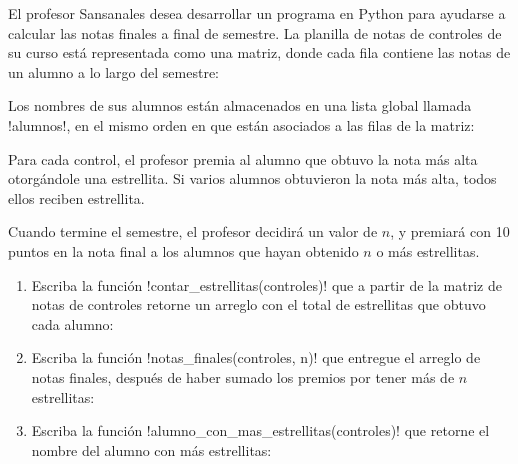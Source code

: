El profesor Sansanales desea desarrollar un programa en Python
para ayudarse a calcular las notas finales a final de semestre.
La planilla de notas de controles de su curso
está representada como una matriz,
donde cada fila contiene las notas de un alumno
a lo largo del semestre:


Los nombres de sus alumnos están almacenados
en una lista global llamada \li!alumnos!,
en el mismo orden en que están asociados a las filas de la matriz:


Para cada control,
el profesor premia al alumno que obtuvo la nota más alta
otorgándole una estrellita.
Si varios alumnos obtuvieron la nota más alta,
todos ellos reciben estrellita.

Cuando termine el semestre,
el profesor decidirá un valor de \(n\),
y premiará con 10 puntos en la nota final
a los alumnos que hayan obtenido \(n\) o más estrellitas.

\begin{enumerate}[leftmargin=0pt,label=\emph{\alph*})]

  \item
    Escriba la función \li!contar_estrellitas(controles)!
    que a partir de la matriz de notas de controles
    retorne un arreglo con el total de estrellitas que obtuvo cada alumno:
    

  \item
    Escriba la función \li!notas_finales(controles, n)!
    que entregue el arreglo de notas finales,
    después de haber sumado los premios
    por tener más de \(n\) estrellitas:
    

  \item
    Escriba la función \li!alumno_con_mas_estrellitas(controles)!
    que retorne el nombre del alumno con más estrellitas:
    

\end{enumerate}

